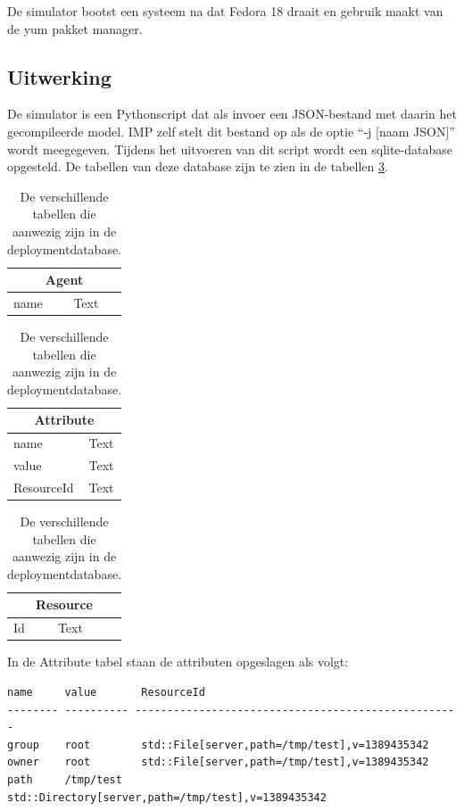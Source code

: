 De simulator bootst een systeem na dat Fedora 18 draait en gebruik maakt van de yum pakket manager.

\subsection{Uitwerking}
\label{simulator:uitwerking}
De simulator is een Pythonscript dat als invoer een JSON-bestand met daarin het gecompileerde model.
IMP zelf stelt dit bestand op als de optie ``-j [naam JSON]'' wordt meegegeven.
Tijdens het uitvoeren van dit script wordt een sqlite-database opgesteld.
De tabellen van deze database zijn te zien in de tabellen \ref{table:deploymentdatabase}.

\begin{table}[h]
\centering
\begin{tabular}[t]{ |l|l| }
  \hline
  \multicolumn{2}{|c|}{Agent} \\
  \hline
  name & Text \\
  \hline
\end{tabular}
\quad
\begin{tabular}[t]{ |l|l| }
  \hline
  \multicolumn{2}{|c|}{Attribute} \\
  \hline
  name & Text \\
  value & Text \\
  ResourceId & Text \\
  \hline
\end{tabular}
\quad
\begin{tabular}[t]{ |l|l| }
  \hline
  \multicolumn{2}{|c|}{Resource} \\
  \hline
  Id & Text \\
  \hline
\end{tabular}
\caption{De verschillende tabellen die aanwezig zijn in de deploymentdatabase.}
\label{table:deploymentdatabase}
\end{table}

In de Attribute tabel staan de attributen opgeslagen als volgt:
\begin{verbatim}
name     value       ResourceId                                                                                          
-------- ---------- ---------------------------------------------------
group    root        std::File[server,path=/tmp/test],v=1389435342             
owner    root        std::File[server,path=/tmp/test],v=1389435342             
path     /tmp/test   std::Directory[server,path=/tmp/test],v=1389435342                        
\end{verbatim}


